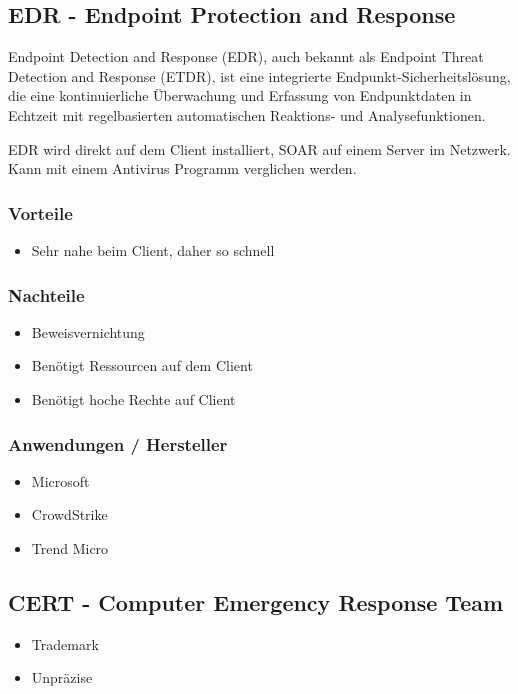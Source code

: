 \subsection{EDR - Endpoint Protection and Response}
Endpoint Detection and Response (EDR), auch bekannt als Endpoint Threat Detection and Response (ETDR), ist eine integrierte Endpunkt-Sicherheitslösung, die eine kontinuierliche Überwachung und Erfassung von Endpunktdaten in Echtzeit mit regelbasierten automatischen Reaktions- und Analysefunktionen.

EDR wird direkt auf dem Client installiert, SOAR auf einem Server im Netzwerk. Kann mit einem Antivirus Programm verglichen werden.

\subsubsection{Vorteile}
\begin{itemize}
    \item Sehr nahe beim Client, daher so schnell
\end{itemize}

\subsubsection{Nachteile}
\begin{itemize}
    \item Beweisvernichtung
    \item Benötigt Ressourcen auf dem Client
    \item Benötigt hoche Rechte auf Client
\end{itemize}

\subsubsection{Anwendungen / Hersteller}
\begin{itemize}
    \item Microsoft
    \item CrowdStrike
    \item Trend Micro
\end{itemize}

\newpage

\subsection{CERT - Computer Emergency Response Team}
\begin{itemize}
    \item Trademark
    \item Unpräzise
\end{itemize}

